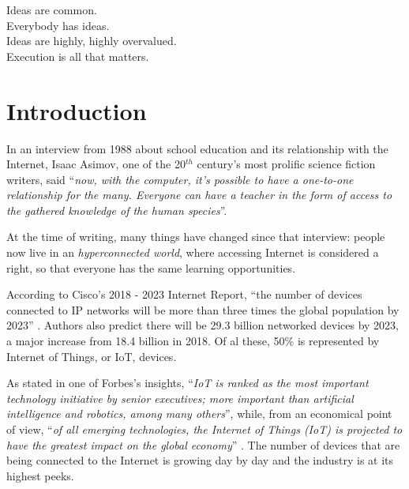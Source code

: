 
\begin{savequote}[65mm]
	 Ideas are common.\\
	 Everybody has ideas.\\
	 Ideas are highly, highly overvalued.\\
	 Execution is all that matters.
\end{savequote}

\chapter{Introduction}\label{chapter:introduction}

	
	In an interview from 1988 about school education and its relationship with the Internet, Isaac Asimov, one of the 20$^{th}$ century's most prolific science fiction writers, said ``\textit{now, with the computer, it's possible to have a one-to-one relationship for the many. Everyone can have a teacher in the form of access to the gathered knowledge of the human species}''.
	
	At the time of writing, many things have changed since that interview: people now live in an \textit{hyperconnected world}, where accessing Internet is considered a right, so that everyone has the same learning opportunities.
	
	According to Cisco's 2018 - 2023 Internet Report, ``the number of devices connected to IP networks will be more than three times the global population by 2023'' \cite{cisco1}.
	Authors also predict there will be 29.3 billion networked devices by 2023, a major increase from 18.4 billion in 2018. 
	Of al these, 50\% is represented by Internet of Things, or IoT, devices.
	
	As stated in one of Forbes's insights, ``\textit{IoT is ranked as the most important technology initiative by senior executives; more important than artificial intelligence and robotics, among many others}'', while, from an economical point of view, ``\textit{of all emerging technologies, the Internet of Things (IoT) is projected to have the greatest impact on the global economy}'' \cite{forbes}.
	The number of devices that are being connected to the Internet is growing day by day and the industry is at its highest peeks.
	
